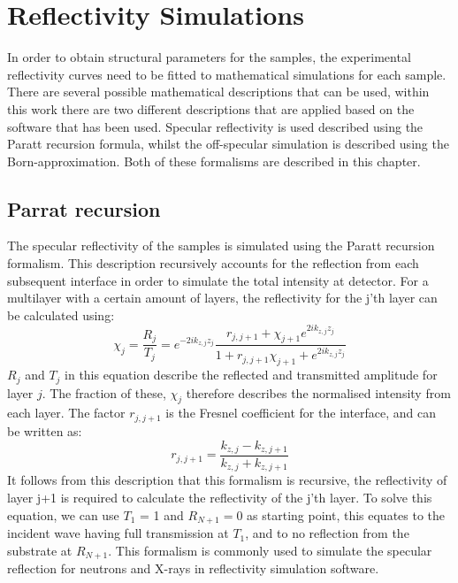 \chapter{Reflectivity Simulations}\label{multilayerdepositions}
In order to obtain structural parameters for the samples, the experimental reflectivity curves need to be fitted to mathematical simulations for each sample. There are several possible mathematical descriptions that can be used, within this work there are two different descriptions that are applied based on the software that has been used. Specular reflectivity is used described using the Paratt recursion formula, whilst the off-specular simulation is described using the Born-approximation. Both of these formalisms are described in this chapter.

\section{Parrat recursion}
The specular reflectivity of the samples is simulated using the Paratt recursion formalism. This description recursively accounts for the reflection from each subsequent interface in order to simulate the total intensity at detector. For a multilayer with a certain amount of layers, the reflectivity for the j'th layer can be calculated using: 
\begin{equation}
	\chi_j = \frac{R_j}{T_j}  = e^{-2ik_{z,j} z_j}   \frac{r_{j,j+1}+\chi_{j+1}e^{2ik_{z,j}z_j}}{1+r_{j,j+1}\chi_{j+1}+e^{2ik_{z,j}z_j}}
\end{equation}
$R_j$ and $T_j$ in this equation describe the reflected and transmitted amplitude for layer $j$. The fraction of these, $\chi_j$ therefore describes the normalised intensity from each layer. The factor $r_{j,j+1}$ is the Fresnel coefficient for the interface, and can be written as:
\begin{equation}
	r_{j,j+1} =  \frac{k_{z,j} - k_{z,j+1}}{k_{z,j} + k_{z,j+1}}
	\end{equation}
It follows from this description that this formalism is recursive, the reflectivity of layer j+1 is required to calculate the reflectivity of the j'th layer. To solve this equation, we can use $T_1$ = 1 and $R_{N+1} = 0$ as starting point, this equates to the incident wave having full transmission at $T_1$, and to no reflection from the substrate at $R_{N+1}$. This formalism is commonly used to simulate the specular reflection for neutrons and X-rays in reflectivity simulation software.
